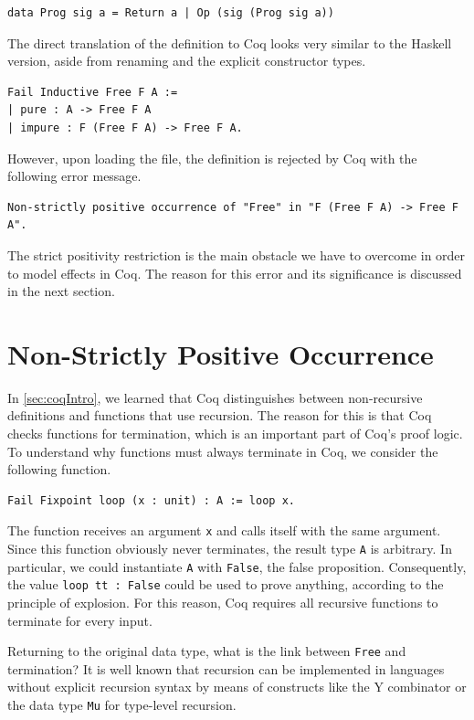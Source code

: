\documentclass[a4paper, 11pt, fleqn, twoside, abstract=on]{scrreprt}
\newcommand{\cinl}[1]{\texttt{#1}}
\begin{document}
\begin{verbatim}
data Prog sig a = Return a | Op (sig (Prog sig a))
\end{verbatim}
\noindent
The direct translation of the definition to Coq looks very similar to the Haskell version, aside from renaming and the explicit constructor types.

\begin{verbatim}
Fail Inductive Free F A :=
| pure : A -> Free F A
| impure : F (Free F A) -> Free F A.
\end{verbatim}
\noindent
However, upon loading the file, the definition is rejected by Coq with the following error message.

\begin{verbatim}
Non-strictly positive occurrence of "Free" in "F (Free F A) -> Free F A".
\end{verbatim}

The strict positivity restriction is the main obstacle we have to overcome in order to model effects in Coq.
The reason for this error and its significance is discussed in the next section.

\section{Non-Strictly Positive Occurrence}
\label{sec:non-strictly}

In \autoref{sec:coqIntro}, we learned that Coq distinguishes between non-recursive definitions and functions that use recursion.
The reason for this is that Coq checks functions for termination, which is an important part of Coq's proof logic.
To understand why functions must always terminate in Coq, we consider the following function.

\begin{verbatim}
Fail Fixpoint loop (x : unit) : A := loop x.
\end{verbatim}
\noindent
The function receives an argument \cinl{x} and calls itself with the same argument.
Since this function obviously never terminates, the result type \cinl{A} is arbitrary.
In particular, we could instantiate \cinl{A} with \cinl{False}, the false proposition.
Consequently, the value \cinl{loop tt : False} could be used to prove anything, according to the principle of explosion.
For this reason, Coq requires all recursive functions to terminate for every input.

Returning to the original data type, what is the link between \cinl{Free} and termination?
It is well known that recursion can be implemented in languages without explicit recursion syntax by means of constructs like the Y combinator or the data type \texttt{Mu} for type-level recursion.
\end{document}
